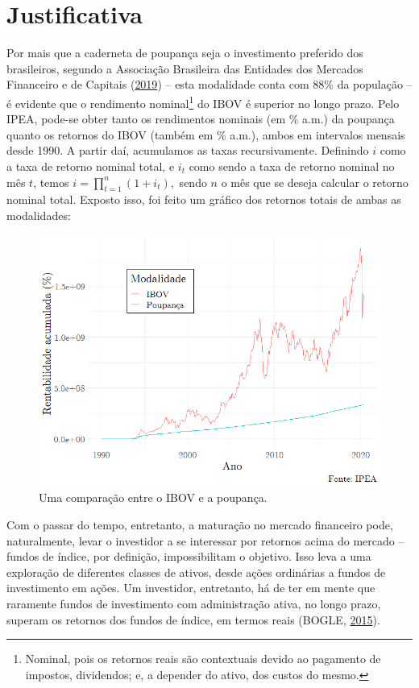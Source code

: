 \documentclass[grad,numbers]{coppe}
\begin{document}
  \hypertarget{justificativa}{%
  \section{Justificativa}\label{justificativa}}
  
  Por mais que a caderneta de poupança seja o investimento preferido dos brasileiros, segundo a Associação Brasileira das Entidades dos Mercados Financeiro e de Capitais (\protect\hyperlink{ref-anbima2019}{2019}) -- esta modalidade conta com 88\% da população -- é evidente que o rendimento nominal\footnote{Nominal, pois os retornos reais são contextuais devido ao pagamento de impostos, dividendos; e, a depender do ativo, dos custos do mesmo.} do IBOV é superior no longo prazo. Pelo IPEA, pode-se obter tanto os rendimentos nominais (em \% a.m.) da poupança quanto os retornos do IBOV (também em \% a.m.), ambos em intervalos mensais desde 1990. A partir daí, acumulamos as taxas recursivamente. Definindo \(i\) como a taxa de retorno nominal total, e \(i_t\) como sendo a taxa de retorno nominal no mês \(t\), temos \(i = \prod_{t=1}^n (1+i_t),\) sendo \(n\) o mês que se deseja calcular o retorno nominal total. Exposto isso, foi feito um gráfico dos retornos totais de ambas as modalidades:
  \begin{figure}[H]
  \includegraphics[width=1\linewidth]{img/ibov-poupanca} \caption{Uma comparação entre o IBOV e a poupança.}\label{fig:unnamed-chunk-1}
  \end{figure}
  Com o passar do tempo, entretanto, a maturação no mercado financeiro pode, naturalmente, levar o investidor a se interessar por retornos acima do mercado -- fundos de índice, por definição, impossibilitam o objetivo. Isso leva a uma exploração de diferentes classes de ativos, desde ações ordinárias a fundos de investimento em ações. Um investidor, entretanto, há de ter em mente que raramente fundos de investimento com administração ativa, no longo prazo, superam os retornos dos fundos de índice, em termos reais (BOGLE, \protect\hyperlink{ref-bogle2015}{2015}).
  
\end{document}
